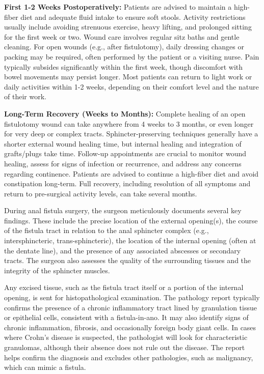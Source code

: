 \textbf{First 1-2 Weeks Postoperatively:}
Patients are advised to maintain a high-fiber diet and adequate fluid intake to ensure soft stools. Activity restrictions usually include avoiding strenuous exercise, heavy lifting, and prolonged sitting for the first week or two. Wound care involves regular sitz baths and gentle cleaning. For open wounds (e.g., after fistulotomy), daily dressing changes or packing may be required, often performed by the patient or a visiting nurse. Pain typically subsides significantly within the first week, though discomfort with bowel movements may persist longer. Most patients can return to light work or daily activities within 1-2 weeks, depending on their comfort level and the nature of their work.

\textbf{Long-Term Recovery (Weeks to Months):}
Complete healing of an open fistulotomy wound can take anywhere from 4 weeks to 3 months, or even longer for very deep or complex tracts. Sphincter-preserving techniques generally have a shorter external wound healing time, but internal healing and integration of grafts/plugs take time. Follow-up appointments are crucial to monitor wound healing, assess for signs of infection or recurrence, and address any concerns regarding continence. Patients are advised to continue a high-fiber diet and avoid constipation long-term. Full recovery, including resolution of all symptoms and return to pre-surgical activity levels, can take several months.

During anal fistula surgery, the surgeon meticulously documents several key findings. These include the precise location of the external opening(s), the course of the fistula tract in relation to the anal sphincter complex (e.g., intersphincteric, trans-sphincteric), the location of the internal opening (often at the dentate line), and the presence of any associated abscesses or secondary tracts. The surgeon also assesses the quality of the surrounding tissues and the integrity of the sphincter muscles.

Any excised tissue, such as the fistula tract itself or a portion of the internal opening, is sent for histopathological examination. The pathology report typically confirms the presence of a chronic inflammatory tract lined by granulation tissue or epithelial cells, consistent with a fistula-in-ano. It may also identify signs of chronic inflammation, fibrosis, and occasionally foreign body giant cells. In cases where Crohn's disease is suspected, the pathologist will look for characteristic granulomas, although their absence does not rule out the disease. The report helps confirm the diagnosis and excludes other pathologies, such as malignancy, which can mimic a fistula.

